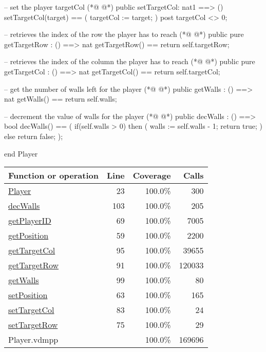 \begin{vdmpp}[breaklines=true]
   -- set the player targetCol
(*@
\label{setTargetCol:83}
@*)
   public setTargetCol: nat1 ==> ()
   setTargetCol(target) ==
   (
    targetCol := target;
   )
   post targetCol <> 0;
   
   -- retrieves the index of the row the player has to reach
(*@
\label{getTargetRow:91}
@*)
   public pure getTargetRow : () ==> nat
   getTargetRow() == return self.targetRow;
   
   -- retrieves the index of the column the player has to reach
(*@
\label{getTargetCol:95}
@*)
   public pure getTargetCol : () ==> nat
   getTargetCol() == return self.targetCol;

   -- get the number of walls left for the player
(*@
\label{getWalls:99}
@*)
   public getWalls : () ==> nat
   getWalls() == return self.walls;
   
   -- decrement the value of walls for the player
(*@
\label{decWalls:103}
@*)
   public decWalls : () ==> bool
   decWalls() ==
   (
    if(self.walls > 0)
    then 
    (
     walls := self.walls - 1;
     return true;
    )
    else return false;
   );
   
end Player
\end{vdmpp}
\bigskip
\begin{longtable}{|l|r|r|r|}
\hline
Function or operation & Line & Coverage & Calls \\
\hline
\hline
\hyperref[Player:23]{Player} & 23&100.0\% & 300 \\
\hline
\hyperref[decWalls:103]{decWalls} & 103&100.0\% & 205 \\
\hline
\hyperref[getPlayerID:69]{getPlayerID} & 69&100.0\% & 7005 \\
\hline
\hyperref[getPosition:59]{getPosition} & 59&100.0\% & 2200 \\
\hline
\hyperref[getTargetCol:95]{getTargetCol} & 95&100.0\% & 39655 \\
\hline
\hyperref[getTargetRow:91]{getTargetRow} & 91&100.0\% & 120033 \\
\hline
\hyperref[getWalls:99]{getWalls} & 99&100.0\% & 80 \\
\hline
\hyperref[setPosition:63]{setPosition} & 63&100.0\% & 165 \\
\hline
\hyperref[setTargetCol:83]{setTargetCol} & 83&100.0\% & 24 \\
\hline
\hyperref[setTargetRow:75]{setTargetRow} & 75&100.0\% & 29 \\
\hline
\hline
Player.vdmpp & & 100.0\% & 169696 \\
\hline
\end{longtable}


